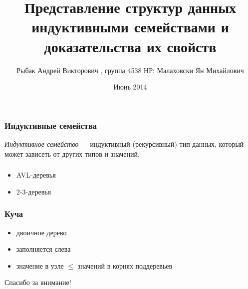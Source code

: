 \documentclass[17pt]{beamer}
\title[Представление структур данных индуктивными семействами и доказательства их свойств]{Представление структур данных индуктивными семействами и доказательства их свойств}
\institute{НИУ ИТМО}
\author[Рыбак А.В.]{Рыбак Андрей Викторович , группа 4538
\newline НР: Малаховски Ян Михайлович}
\date{
Июнь 2014
}
\begin{document}
\maketitle

\begin{frame}
    \frametitle{Индуктивные семейства}
    \emph{Индуктивное семейство} — индуктивный (рекурсивный) тип данных,
        который может зависеть от других типов и значений.
\end{frame}

\begin{frame}
    \frametitle{}
    \begin{itemize}
        \item AVL-деревья
        \item 2-3-деревья
    \end{itemize}
\end{frame}

\AgdaHide{

}

\begin{frame}
    \frametitle{Куча}
    \begin{itemize}
        \item двоичное дерево
        \item заполняется слева
        \item значение в узле $ \leq $ значений в корнях поддеревьев
    \end{itemize}
\end{frame}
\fontsize{14pt}{14pt}\selectfont


\begin{frame}
    \Large Спасибо за внимание!
\end{frame}
\end{document}
